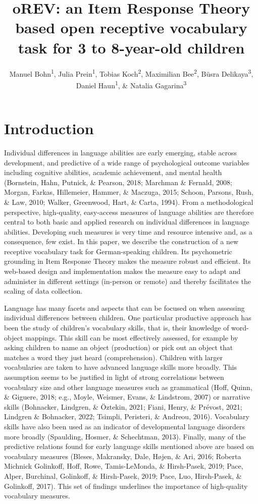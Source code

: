 \documentclass[
  man,floatsintext]{apa6}
\title{oREV: an Item Response Theory based open receptive vocabulary task for 3 to 8-year-old children}
\author{Manuel Bohn\textsuperscript{1}, Julia Prein\textsuperscript{1}, Tobias Koch\textsuperscript{2}, Maximilian Bee\textsuperscript{2}, Büsra Delikaya\textsuperscript{3}, Daniel Haun\textsuperscript{1}, \& Natalia Gagarina\textsuperscript{3}}
\date{}
\affiliation{\vspace{0.5cm}\textsuperscript{1} Department of Comparative Cultural Psychology, Max Planck Institute for Evolutionary Anthropology, Leipzig, Germany\\\textsuperscript{2} Institut für Psychologie, Friedrich-Schiller-Universität Jena, Germany\\\textsuperscript{3} Leibniz-Zentrum Allgemeine Sprachwissenschaft, Berlin, Germany}
\begin{document}
\maketitle

\hypertarget{introduction}{%
\section{Introduction}\label{introduction}}

Individual differences in language abilities are early emerging, stable across development, and predictive of a wide range of psychological outcome variables including cognitive abilities, academic achievement, and mental health (Bornstein, Hahn, Putnick, \& Pearson, 2018; Marchman \& Fernald, 2008; Morgan, Farkas, Hillemeier, Hammer, \& Maczuga, 2015; Schoon, Parsons, Rush, \& Law, 2010; Walker, Greenwood, Hart, \& Carta, 1994). From a methodological perspective, high-quality, easy-access measures of language abilities are therefore central to both basic and applied research on individual differences in language abilities. Developing such measures is very time and resource intensive and, as a consequence, few exist. In this paper, we describe the construction of a new receptive vocabulary task for German-speaking children. Its psychometric grounding in Item Response Theory makes the measure robust and efficient. Its web-based design and implementation makes the measure easy to adapt and administer in different settings (in-person or remote) and thereby facilitates the scaling of data collection.

Language has many facets and aspects that can be focused on when assessing individual differences between children. One particular productive approach has been the study of children's vocabulary skills, that is, their knowledge of word-object mappings. This skill can be most effectively assessed, for example by asking children to name an object (production) or pick out an object that matches a word they just heard (comprehension). Children with larger vocabularies are taken to have advanced language skills more broadly. This assumption seems to be justified in light of strong correlations between vocabulary size and other language measures such as grammatical (Hoff, Quinn, \& Giguere, 2018; e.g., Moyle, Weismer, Evans, \& Lindstrom, 2007) or narrative skills (Bohnacker, Lindgren, \& Öztekin, 2021; Fiani, Henry, \& Prévost, 2021; Lindgren \& Bohnacker, 2022; Tsimpli, Peristeri, \& Andreou, 2016). Vocabulary skills have also been used as an indicator of developmental language disorders more broadly (Spaulding, Hosmer, \& Schechtman, 2013). Finally, many of the predictive relations found for early language skills mentioned above are based on vocabulary measures (Bleses, Makransky, Dale, Højen, \& Ari, 2016; Roberta Michnick Golinkoff, Hoff, Rowe, Tamis-LeMonda, \& Hirsh-Pasek, 2019; Pace, Alper, Burchinal, Golinkoff, \& Hirsh-Pasek, 2019; Pace, Luo, Hirsh-Pasek, \& Golinkoff, 2017). This set of findings underlines the importance of high-quality vocabulary measures.
\end{document}
